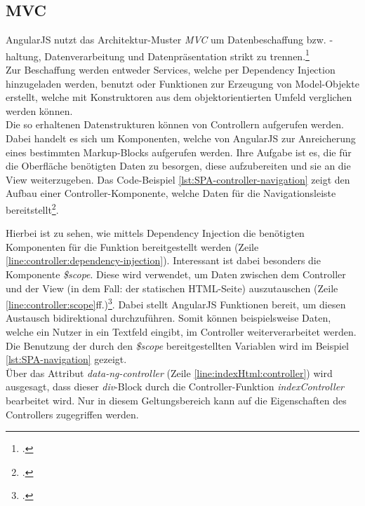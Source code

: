\subsection{MVC}
\label{ssec:SPA-MVC}
AngularJS nutzt das Architektur-Muster \textit{\ac{MVC}} um Datenbeschaffung bzw. -haltung, Datenverarbeitung und Datenpräsentation strikt zu trennen.\footcite[S.34]{book:AngularJs:Steyer2015} \\ 
Zur Beschaffung werden entweder Services, welche per Dependency Injection hinzugeladen werden, benutzt oder Funktionen zur Erzeugung von Model-Objekte erstellt, welche mit Konstruktoren aus dem objektorientierten Umfeld verglichen werden können. \\
Die so erhaltenen Datenstrukturen können von Controllern aufgerufen werden. Dabei handelt es sich um Komponenten, welche von AngularJS zur Anreicherung eines bestimmten \gls{Markup}-Blocks aufgerufen werden. Ihre Aufgabe ist es, die für die Oberfläche benötigten Daten zu besorgen, diese aufzubereiten und sie an die View weiterzugeben. Das Code-Beispiel \ref{lst:SPA-controller-navigation} zeigt den Aufbau einer Controller-Komponente, welche Daten für die Navigationsleiste bereitstellt\footcite{online:angular:controller}.

Hierbei ist zu sehen, wie mittels Dependency Injection die benötigten Komponenten für die Funktion bereitgestellt werden (Zeile \ref{line:controller:dependency-injection}). Interessant ist dabei besonders die Komponente \textit{\$scope}. Diese wird verwendet, um Daten zwischen dem Controller und der View (in dem Fall: der statischen HTML-Seite) auszutauschen (Zeile \ref{line:controller:scope}ff.)\footcite{online:angular:scopes}. Dabei stellt AngularJS Funktionen bereit, um diesen Austausch bidirektional durchzuführen. Somit können beispielsweise Daten, welche ein Nutzer in ein Textfeld eingibt, im Controller weiterverarbeitet werden.\\
Die Benutzung der durch den \textit{\$scope} bereitgestellten Variablen wird im Beispiel \ref{lst:SPA-navigation} gezeigt.\\

Über das Attribut \textit{data-ng-controller} (Zeile \ref{line:indexHtml:controller}) wird ausgesagt, dass dieser \textit{div}-Block durch die Controller-Funktion \textit{indexController} bearbeitet wird. Nur in diesem Geltungsbereich kann auf die Eigenschaften des Controllers zugegriffen werden. \\
